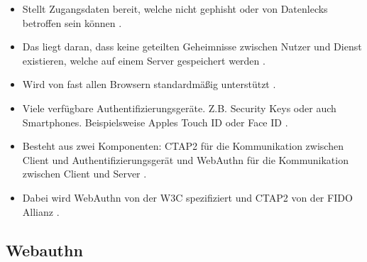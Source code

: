\begin{itemize}
    \item Stellt Zugangsdaten bereit, welche nicht gephisht oder von Datenlecks betroffen sein können \cite{lyastani2020fido2}.
    \item Das liegt daran, dass keine geteilten Geheimnisse zwischen Nutzer und Dienst existieren, welche auf einem Server gespeichert werden \cite{morii2017research}.
    \item Wird von fast allen Browsern standardmäßig unterstützt \cite{lyastani2020fido2}.
    \item Viele verfügbare Authentifizierungsgeräte. Z.B. Security Keys oder auch Smartphones. Beispielsweise Apples Touch ID oder Face ID \cite{lyastani2020fido2}.
    \item Besteht aus zwei Komponenten: CTAP2 für die Kommunikation zwischen Client und Authentifizierungsgerät und WebAuthn für die Kommunikation zwischen Client und Server \cite{farke2020you}.
    \item Dabei wird WebAuthn von der \ac{W3C} spezifiziert und CTAP2 von der \ac{FIDO} Allianz \cite{farke2020you}.
\end{itemize}

\subsection{Webauthn}

